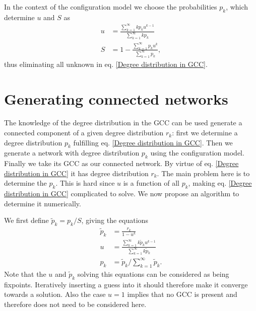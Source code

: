 \documentclass[a4paper, draft]{article}
\begin{document}
In the context of the configuration model we choose the probabilities $p_k$, which determine $u$ and $S$ as
\begin{align}
	u &= \frac{\sum_{k=1}^\infty k p_k u^{k-1}}{\sum_{k=1}^\infty k p_k} \\
	S &= 1 - \frac{\sum_{k=1}^\infty p_k u^{k}}{\sum_{k=1}^\infty p_k},
\end{align}
thus eliminating all unknown in eq. \eqref{Degree distribution in GCC}.

\begin{figure}
\end{figure}

\section{Generating connected networks}

The knowledge of the degree distribution in the GCC can be used generate a connected component of a given degree distribution $r_k$: first we determine a degree distribution $p_k$ fulfilling eq. \eqref{Degree distribution in GCC}. Then we generate a network with degree distribution $p_k$ using the configuration model. Finally we take its GCC as our connected network. By virtue of eq. \eqref{Degree distribution in GCC} it has degree distribution $r_k$. The main problem here is to determine the $p_k$. This is hard since $u$ is a function of all $p_k$, making eq. \eqref{Degree distribution in GCC} complicated to solve. We now propose an algorithm to determine it numerically.

We first define $\tilde{p}_k = p_k/S$, giving the equations
\begin{align}
	\tilde{p}_k &= \frac{r_k}{1 - u^k} \\
	u &= \frac{\sum_{k=1}^\infty k \tilde{p}_k u^{k-1}}{\sum_{k=1}^\infty k \tilde{p}_k}\\
	p_k &= \tilde{p}_k / \sum_{k=1}^\infty \tilde{p}_k.
\end{align}
Note that the $u$ and $\tilde{p}_k$ solving this equations can be considered as being fixpoints. Iteratively inserting a guess into it should therefore make it converge towards a solution. Also the case $u = 1$ implies that no GCC is present and therefore does not need to be considered here.
\end{document}
